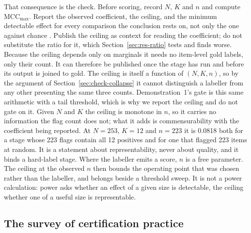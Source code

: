 \documentclass[review]{elsarticle}
\begin{document}
That consequence is the check. Before scoring, record $N$, $K$ and $n$ and
compute $\mathrm{MCC}_{\max}$. Report the observed coefficient, the ceiling, and the minimum detectable effect
for every comparison the conclusion rests on, not only the one against chance
\cite{hanley1982meaning}. Publish the ceiling as context for reading the
coefficient; do not substitute the ratio for it, which
Section~\ref{sec:res-ratio} tests and finds worse. Because the ceiling depends only on marginals it
needs no item-level gold labels, only their count. It can therefore be published
once the stage has run and before its output is joined to gold. The ceiling is itself a function of $(N,K,n)$, so by the argument of
Section~\ref{sec:check-collapse} it cannot distinguish a labeller from any other
presenting the same three counts. Demonstration~1's gate is this same arithmetic
with a tail threshold, which is why we report the ceiling and do not gate on it.
Given $N$ and $K$ the ceiling is monotone in $n$, so it carries no information
the flag count does not; what it adds is commensurability with the coefficient
being reported. At $N=253$, $K=12$ and $n=223$ it is 0.0818
both for a stage whose 223 flags contain all 12 positives and for one that
flagged 223 items at random. It is a statement about representability, never
about quality, and it binds a hard-label stage. Where the labeller emits a score,
$n$ is a free parameter. The ceiling at the observed $n$ then bounds the
operating point that was chosen rather than the labeller, and belongs beside a threshold
sweep. It is not a power calculation: power asks whether an effect of a given size is
detectable, the ceiling whether one of a useful size is representable.

\subsection{The survey of certification practice}
\label{sec:survey-method}
\end{document}
